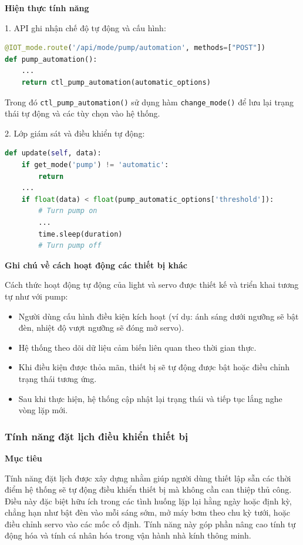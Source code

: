 \textbf{Hiện thực tính năng}

1. API ghi nhận chế độ tự động và cấu hình:

\begin{lstlisting}[language=Python]
@IOT_mode.route('/api/mode/pump/automation', methods=["POST"])
def pump_automation():
    ...
    return ctl_pump_automation(automatic_options)
\end{lstlisting}

Trong đó \texttt{ctl\_pump\_automation()} sử dụng hàm \texttt{change\_mode()} để lưu lại trạng thái tự động và các tùy chọn vào hệ thống.

2. Lớp giám sát và điều khiển tự động:

\begin{lstlisting}[language=Python]
def update(self, data):
    if get_mode('pump') != 'automatic':
        return
    ...
    if float(data) < float(pump_automatic_options['threshold']):
        # Turn pump on
        ...
        time.sleep(duration)
        # Turn pump off
\end{lstlisting}

\textbf{Ghi chú về cách hoạt động các thiết bị khác}

Cách thức hoạt động tự động của light và servo được thiết kế và triển khai tương tự như với pump:
\begin{itemize}
    \item Người dùng cấu hình điều kiện kích hoạt (ví dụ: ánh sáng dưới ngưỡng sẽ bật đèn, nhiệt độ vượt ngưỡng sẽ đóng mở servo).
    \item Hệ thống theo dõi dữ liệu cảm biến liên quan theo thời gian thực.
    \item Khi điều kiện được thỏa mãn, thiết bị sẽ tự động được bật hoặc điều chỉnh trạng thái tương ứng.
    \item Sau khi thực hiện, hệ thống cập nhật lại trạng thái và tiếp tục lắng nghe vòng lặp mới.
\end{itemize}

\subsubsection{Tính năng đặt lịch điều khiển thiết bị}

\textbf{Mục tiêu}

Tính năng đặt lịch được xây dựng nhằm giúp người dùng thiết lập sẵn các thời điểm hệ thống sẽ tự động điều khiển thiết bị mà không cần can thiệp thủ công. Điều này đặc biệt hữu ích trong các tình huống lặp lại hằng ngày hoặc định kỳ, chẳng hạn như bật đèn vào mỗi sáng sớm, mở máy bơm theo chu kỳ tưới, hoặc điều chỉnh servo vào các mốc cố định. Tính năng này góp phần nâng cao tính tự động hóa và tính cá nhân hóa trong vận hành nhà kính thông minh.

